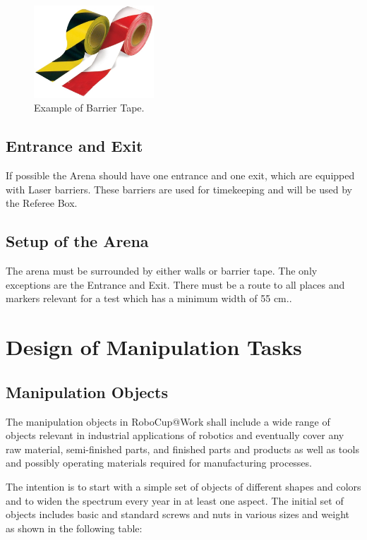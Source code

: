 \begin{figure}
\centering
\includegraphics[width= 0.4\textwidth ]{../images/example_barrier_tape.jpg}
\caption{Example of Barrier Tape.}
\label{fig:barrier_tape}
\end{figure}

\subsection{Entrance and Exit}
If possible the Arena should have one entrance and one exit, which are equipped with Laser barriers. These barriers are used for timekeeping and will be used by the Referee Box.

\subsection{Setup of the Arena}
The arena must be surrounded by either walls or barrier tape. The only exceptions are the Entrance and Exit. There must be a route to all places and markers relevant for a test which has a minimum width of 55 cm..

\section{Design of Manipulation Tasks}
\label{sec:ManipulationTasks}

\subsection{Manipulation Objects}
The manipulation objects in RoboCup@Work shall include a wide range of objects relevant in industrial applications of robotics and eventually cover any raw material, semi-finished parts, and finished parts and products as well as tools and possibly operating materials required for manufacturing processes.
\par
The intention is to start with a simple set of objects of different shapes and colors and to widen the spectrum every year in at least one aspect. The initial set of objects includes basic and standard screws and nuts in various sizes and weight as shown in the following table:


